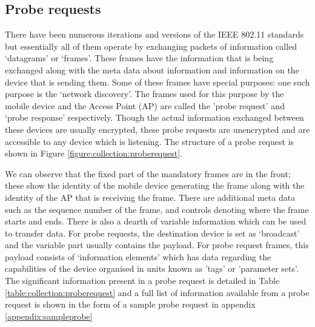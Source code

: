 \subsection{Probe requests}

There have been numerous iterations and versions of the IEEE 802.11 standards but essentially all of them operate by exchanging packets of information called `datagrams' or `frames'.
These frames have the information that is being exchanged along with the meta data about information and information on the device that is sending them.
Some of these frames have special purposes: one such purpose is the `network discovery'.
The frames used for this purpose by the mobile device and the Access Point (AP) are called the 'probe request' and `probe response' respectively.
Though the actual information exchanged between these devices are usually encrypted, these probe requests are unencrypted and are accessible to any device which is listening.
The structure of a probe request is shown in Figure \ref{figure:collection:proberequest}.

We can observe that the fixed part of the mandatory frames are in the front; these show the identity of the mobile device generating the frame along with the identity of the AP that is receiving the frame.
There are additional meta data such as the sequence number of the frame, and controls denoting where the frame starts and ends.
There is also a dearth of variable information which can be used to transfer data.
For probe requests, the destination device is set as `broadcast' and the variable part usually contains the payload.
For probe request frames, this payload consists of `information elements' which has data regarding the capabilities of the device organised in units known as 'tags' or 'parameter sets'.
The significant information present in a probe request is detailed in Table \ref{table:collection:proberequest} and a full list of information available from a probe request is shown in the form of a sample probe request in appendix \ref{appendix:sampleprobe}

